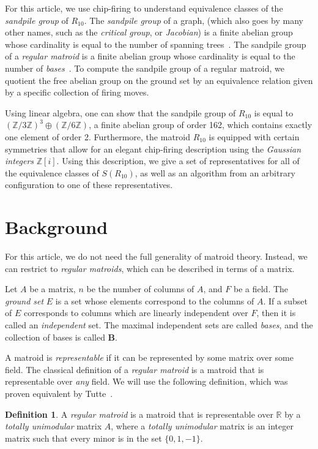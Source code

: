 \documentclass[12p]{amsart}
\numberwithin{equation}{section}
\theoremstyle{plain}
\theoremstyle{definition}
\newtheorem{defn}[thm]{Definition}
\newcommand{\Z}{\mathbb {Z}}
\begin{document}
For this article, we use chip-firing to understand equivalence classes of the \emph{sandpile group} of $R_{10}$. The \emph{sandpile group} of a graph, (which also goes by many other names, such as the \emph{critical group}, or \emph{Jacobian}) is a finite abelian group whose cardinality is equal to the number of spanning trees~\cite{Biggs99}. The sandpile group of a \emph{regular matroid} is a finite abelian group whose cardinality is equal to the number of \emph{bases}~\cite{Merino}. To compute the sandpile group of a regular matroid, we quotient the free abelian group on the ground set by an equivalence relation given by a specific collection of firing moves. 

Using linear algebra, one can show that the sandpile group of $R_{10}$ is equal to $(\Z/3\Z)^3 \oplus (\Z/6\Z)$, a finite abelian group of order 162, which contains exactly one element of order 2. Furthermore, the matroid $R_{10}$ is equipped with certain symmetries that allow for an elegant chip-firing description using the \emph{Gaussian integers} $\Z[i]$. Using this description, we give a set of representatives for all of the equivalence classes of $S(R_{10})$, as well as an algorithm from an arbitrary configuration to one of these representatives. 

\section{Background} 

For this article, we do not need the full generality of matroid theory. Instead, we can restrict to \emph{regular matroids}, which can be described in terms of a matrix.

Let $A$ be a matrix, $n$ be the number of columns of $A$, and $F$ be a field. The \emph{ground set} $E$ is a set whose elements correspond to the columns of $A$. If a subset of $E$ corresponds to columns which are linearly independent over $F$, then it is called an \emph{independent} set. The maximal independent sets are called \emph{bases}, and the collection of bases is called $\mathbf B$.

A matroid is \emph{representable} if it can be represented by some matrix over some field. The classical definition of a \emph{regular matroid} is a matroid that is representable over \emph{any} field. We will use the following definition, which was proven equivalent by Tutte~\cite{Tutte}. 
\begin{defn}
    A \emph{regular matroid} is a matroid that is representable over $\mathbb R$ by a \emph{totally unimodular} matrix $A$, where a \emph{totally unimodular} matrix is an integer matrix such that every minor is in the set $\{0, 1,-1\}$. 
\end{defn}
\end{document}
